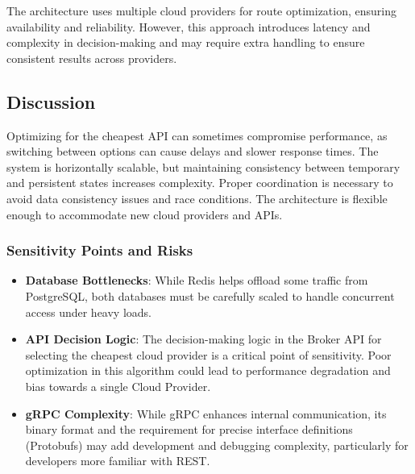 The architecture uses multiple cloud providers for route optimization, ensuring availability and reliability. However, this approach introduces latency and complexity in decision-making and may require extra handling to ensure consistent results across providers.

\subsection{Discussion}\label{sec:architectural_highlights}


Optimizing for the cheapest API can sometimes compromise performance, as switching between options can cause delays and slower response times. The system is horizontally scalable, but maintaining consistency between temporary and persistent states increases complexity. Proper coordination is necessary to avoid data consistency issues and race conditions. The architecture is flexible enough to accommodate new cloud providers and APIs.

\subsubsection{Sensitivity Points and Risks}

\begin{itemize}
    \item \textbf{Database Bottlenecks}: While Redis helps offload some traffic from PostgreSQL, both databases must be carefully scaled to handle concurrent access under heavy loads.
    \item \textbf{API Decision Logic}: The decision-making logic in the Broker API for selecting the cheapest cloud provider is a critical point of sensitivity. Poor optimization in this algorithm could lead to performance degradation and bias towards a single Cloud Provider. 
    \item \textbf{gRPC Complexity}: While gRPC enhances internal communication, its binary format and the requirement for precise interface definitions (Protobufs) may add development and debugging complexity, particularly for developers more familiar with REST. 
\end{itemize}
